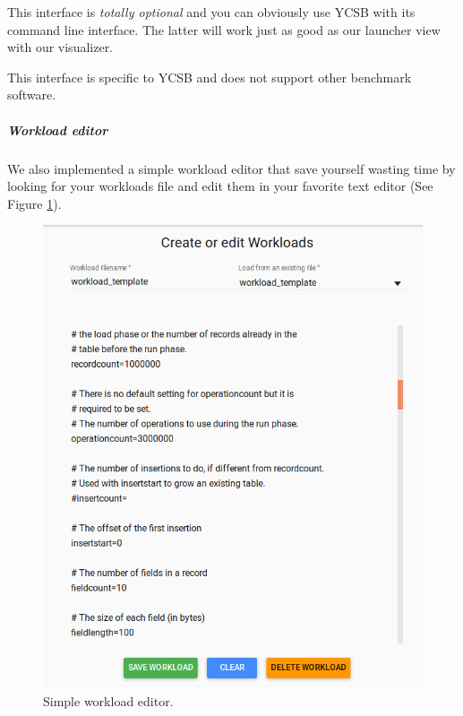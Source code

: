 \documentclass[a4paper,11pt]{report}
\begin{document}
\bigskip

This interface is \textit{totally optional} and you can obviously use YCSB with its command line interface. The latter will work just as good as our launcher view with our visualizer.

This interface is specific to YCSB and does not support other benchmark software.

\subparagraph{Workload editor}

We also implemented a simple workload editor that save yourself wasting time by looking for your workloads file and edit them in your favorite text editor (See Figure \ref{workload_editor}).

\begin{figure}[ht]
\begin{center}
\includegraphics[width=1\linewidth]{images/workload_editor.png}
\caption{Simple workload editor.}
\label{workload_editor}
\end{center}
\end{figure}

\clearpage
\end{document}
